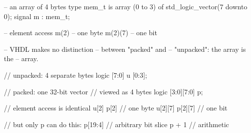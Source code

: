 \begin{rosetta}
\begin{rleft}
-- an array of 4 bytes
type mem_t is array (0 to 3) of
  std_logic_vector(7 downto 0);
signal m : mem_t;

-- element access
m(2)          -- one byte
m(2)(7)       -- one bit

-- VHDL makes no distinction
-- between "packed" and
-- "unpacked": the array is the
-- array.
\end{rleft}
\begin{rright}
// unpacked: 4 separate bytes
logic [7:0] u [0:3];

// packed: one 32-bit vector
// viewed as 4 bytes
logic [3:0][7:0] p;

// element access is identical
u[2]      p[2]      // one byte
u[2][7]   p[2][7]   // one bit

// but only p can do this:
p[19:4]   // arbitrary bit slice
p + 1     // arithmetic
\end{rright}
\end{rosetta}

